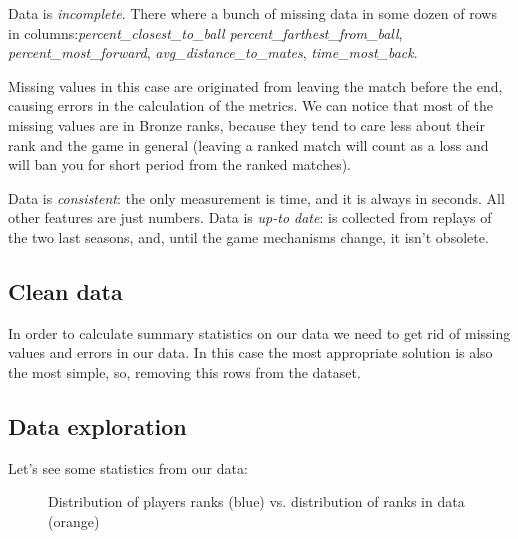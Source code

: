 Data is \textit{incomplete}. There where a bunch of missing data in some dozen of rows in columns:\textit{percent\_closest\_to\_ball} \textit{percent\_farthest\_from\_ball}, \textit{percent\_most\_forward}, \textit{avg\_distance\_to\_mates}, \textit{time\_most\_back}.

Missing values in this case are originated from leaving the match before the end, causing errors in the calculation of the metrics. We can notice that most of the missing values are in Bronze ranks, because they tend to care less about their rank and the game in general (leaving a ranked match will count as a loss and will ban you for short period from the ranked matches).

Data is \textit{consistent}: the only measurement is time, and it is always in seconds. All other features are just numbers.
Data is \textit{up-to date}: is collected from replays of the two last seasons, and, until the game mechanisms change, it isn't obsolete.

\subsection{Clean data}

In order to calculate summary statistics on our data we need to get rid of missing values and errors in our data.
In this case the most appropriate solution is also the most simple, so, removing this rows from the dataset.

\subsection{Data exploration}

Let's see some statistics from our data:

\begin{figure}[H]
    \label{fig:rank_distr}
    \caption{Distribution of players ranks (blue) vs. distribution of ranks in data (orange)}
\end{figure}

